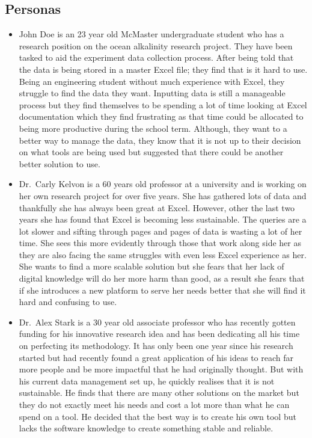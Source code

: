 \documentclass[12pt]{article}
\begin{document}
\subsection{Personas}
\begin{itemize}
  \item John Doe is an 23 year old McMaster undergraduate student who has a
  research position on the ocean alkalinity research project. They have been
  tasked to aid the experiment data collection process. After being told that
  the data is being stored in a master Excel file; they find that is it hard to
  use. Being an engineering student without much experience with Excel, they
  struggle to find the data they want. Inputting data is still a manageable
  process but they find themselves to be spending a lot of time looking at Excel
  documentation which they find frustrating as that time could be allocated to
  being more productive during the school term. Although, they want to a better
  way to manage the data, they know that it is not up to their decision on what
  tools are being used but suggested that there could be another better solution
  to use. 
  \item Dr.\ Carly Kelvon is a 60 years old professor at a university and
  is working on her own research project for over five years. She has gathered
  lots of data and thankfully she has always been great at Excel. However, other
  the last two years she has found that Excel is becoming less sustainable. The
  queries are a lot slower and sifting through pages and pages of data is
  wasting a lot of her time. She sees this more evidently through those that
  work along side her as they are also facing the same struggles with even less
  Excel experience as her. She wants to find a more scalable solution but she
  fears that her lack of digital knowledge will do her more harm than good, as a
  result she fears that if she introduces a new platform to serve her needs
  better that she will find it hard and confusing to use. 
  \item Dr.\ Alex Stark is a 30 year old associate professor who has recently
  gotten funding for his innovative research idea and has been dedicating all
  his time on perfecting its methodology. It has only been one year since his
  research started but had recently found a great application of his ideas to
  reach far more people and be more impactful that he had originally thought.
  But with his current data management set up, he quickly realises that it is not
  sustainable. He finds that there are many other solutions on the market but
  they do not exactly meet his needs and cost a lot more than what he can spend
  on a tool. He decided that the best way is to create his own tool but lacks
  the software knowledge to create something stable and reliable. 
\end{itemize}
    
\end{document}
